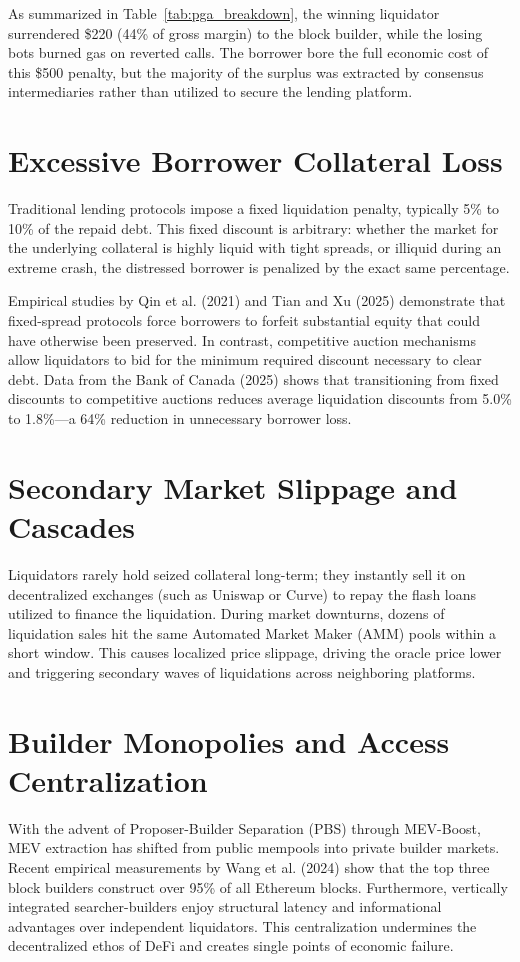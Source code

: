 As summarized in Table~\ref{tab:pga_breakdown}, the winning liquidator surrendered \$220 (44\% of gross margin) to the block builder, while the losing bots burned gas on reverted calls. The borrower bore the full economic cost of this \$500 penalty, but the majority of the surplus was extracted by consensus intermediaries rather than utilized to secure the lending platform.

\section{Excessive Borrower Collateral Loss}
Traditional lending protocols impose a fixed liquidation penalty, typically 5\% to 10\% of the repaid debt. This fixed discount is arbitrary: whether the market for the underlying collateral is highly liquid with tight spreads, or illiquid during an extreme crash, the distressed borrower is penalized by the exact same percentage.

Empirical studies by Qin et al. (2021) and Tian and Xu (2025) demonstrate that fixed-spread protocols force borrowers to forfeit substantial equity that could have otherwise been preserved. In contrast, competitive auction mechanisms allow liquidators to bid for the minimum required discount necessary to clear debt. Data from the Bank of Canada (2025) shows that transitioning from fixed discounts to competitive auctions reduces average liquidation discounts from 5.0\% to 1.8\%---a 64\% reduction in unnecessary borrower loss.

\section{Secondary Market Slippage and Cascades}
Liquidators rarely hold seized collateral long-term; they instantly sell it on decentralized exchanges (such as Uniswap or Curve) to repay the flash loans utilized to finance the liquidation. During market downturns, dozens of liquidation sales hit the same Automated Market Maker (AMM) pools within a short window. This causes localized price slippage, driving the oracle price lower and triggering secondary waves of liquidations across neighboring platforms.

\section{Builder Monopolies and Access Centralization}
With the advent of Proposer-Builder Separation (PBS) through MEV-Boost, MEV extraction has shifted from public mempools into private builder markets. Recent empirical measurements by Wang et al. (2024) show that the top three block builders construct over 95\% of all Ethereum blocks. Furthermore, vertically integrated searcher-builders enjoy structural latency and informational advantages over independent liquidators. This centralization undermines the decentralized ethos of DeFi and creates single points of economic failure.

